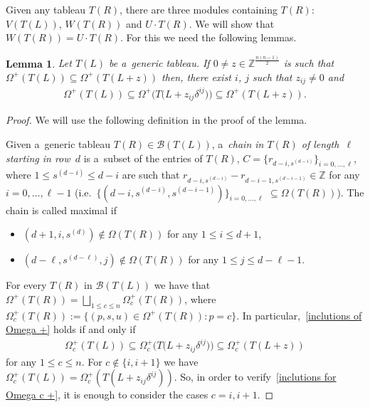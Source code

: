 \documentclass[11pt]{article}
\numberwithin{equation}{section}
\newtheorem{Lemma}[Theorem]{Lemma}
\begin{document}
Given any tableau $T(R)$, there are three modules containing $T(R)$: $V(T(L))$, $ W(T(R))$ and $U\cdot T(R)$.
We will show that $ W(T(R))=U\cdot T(R)$.
For this we need the following lemmas.

\begin{Lemma}
\label{paths for connected tableaux}
Let $T(L)$ be a~generic tableau.
If $0\neq z\in\mathbb{Z}^{\frac{n(n-1)}{2}}$ is such that $\Omega^{+}(T(L))\subseteq\Omega^{+}(T(L+z))$ then, there
exist $i$, $j$ such that $z_{ij}\neq 0$ and
\begin{gather}
\label{inclutions of Omega +}
\Omega^{+}(T(L))\subseteq\Omega^{+}\big(T\big(L+z_{ij}\delta^{ij}\big)\big)\subseteq\Omega^{+}(T(L+z)).
\end{gather}
\end{Lemma}
\begin{proof}
We will use the following def\/inition in the proof of the lemma.

\begin{Definition}
Given a~generic tableau $T(R)\in\mathcal{B}(T(L))$, a~\emph{chain in $T(R)$ of length~$\ell$ starting in row~$d$} is
a~subset of the entries of $T(R)$, $C=\{r_{d-i,s^{(d-i)}}\}_{i=0,\ldots, \ell}$, where $1\leq s^{(d-i)}\leq d-i$ are
such that $r_{d-i,s^{(d-i)}}-r_{d-i-1,s^{(d-i-1)}}\in\mathbb{Z}$ for any $i=0,\ldots,\ell-1$
(i.e.~$\{(d-i,s^{(d-i)},s^{(d-i-1)})\}_{i=0,\ldots,\ell}$ $\subseteq\Omega(T(R))$). The chain is called maximal if
\begin{itemize}\itemsep=0pt
\item[(i)] $(d+1,i,s^{(d)})\notin\Omega(T(R))$ for any $1\leq i\leq d+1$,
\item[(ii)] $(d-\ell,s^{(d-\ell)},j)\notin\Omega(T(R))$ for any $1\leq j\leq d-\ell-1$.
\end{itemize}
\end{Definition}

For every $T(R)$ in $\mathcal{B}(T(L))$ we have that $\Omega^{+}(T(R))= \bigsqcup_{1\leq c\leq n}\Omega^{+}_{c}(T(R))$,
where $\Omega^{+}_{c}(T(R)):=\{(p,s,u)\in\Omega^{+}(T(R)): p=c\}$.
In particular,~\eqref{inclutions of Omega +} holds if and only if
\begin{gather}
\label{inclutions for Omega c +}
\Omega^{+}_{c}(T(L))\subseteq\Omega^{+}_{c}\big(T\big(L+z_{ij}\delta^{ij}\big)\big)\subseteq\Omega^{+}_{c}(T(L+z))
\end{gather}
for any $1\leq c\leq n$.
For $c\notin\{i,i+1 \}$ we have $\Omega^{+}_{c}(T(L))=\Omega^{+}_{c}(T(L+z_{ij}\delta^{ij}))$.
So, in order to verify~\eqref{inclutions for Omega c +}, it is enough to consider the cases $c=i, i+1$.


\end{proof}
\end{document}
